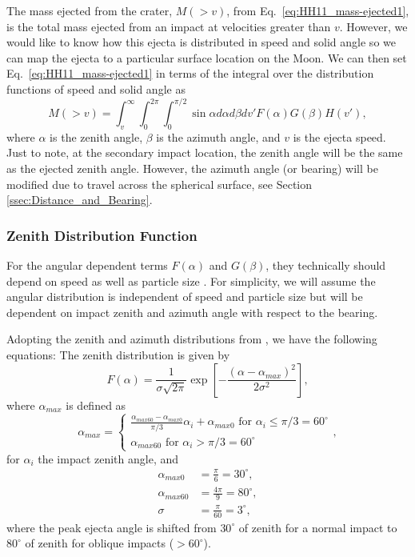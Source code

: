 \documentclass{hitec}
\numberwithin{equation}{section}
\begin{document}
The mass ejected from the crater, $M(>v)$, from Eq.\ \eqref{eq:HH11_mass-ejected1}, is the total mass ejected from an impact at velocities greater than $v$. However, we would like to know how this ejecta is distributed in speed and solid angle so we can map the ejecta to a particular surface location on the Moon. We can then set Eq.\ \eqref{eq:HH11_mass-ejected1} in terms of the integral over the distribution functions of speed and solid angle as
\begin{equation}
M(>v) = \int_{v}^{\infty}\int_{0}^{2\pi}\int_{0}^{\pi/2}\sin\alpha d\alpha d\beta dv' F(\alpha)G(\beta)H(v'),
\end{equation} 
where $\alpha$ is the zenith angle, $\beta$ is the azimuth angle, and $v$ is the ejecta speed. Just to note, at the secondary impact location, the zenith angle will be the same as the ejected zenith angle. However, the azimuth angle (or bearing) will be modified due to travel across the spherical surface, see Section \ref{ssec:Distance_and_Bearing}.



\subsubsection{Zenith Distribution Function}
\label{sssec:ZenithDistributionFunction}


For the angular dependent terms $F(\alpha)$ and $G(\beta)$, they technically should depend on speed as well as particle size \citep[e.g.,][]{rival1999modeling}. For simplicity, we will assume the angular distribution is independent of speed and particle size but will be dependent on impact zenith and azimuth angle with respect to the bearing.

Adopting the zenith and azimuth distributions from \cite{rival1999modeling}, we have the following equations:
The zenith distribution is given by
\begin{equation}\label{eq:Rival_zenith-dist}
F(\alpha) = \frac{1}{\sigma\sqrt{2\pi}}\exp\left[-\frac{(\alpha-\alpha_{max})^2}{2\sigma^2}\right],
\end{equation}
where $\alpha_{max}$ is defined as
\begin{equation}
\alpha_{max} = 
\begin{cases}
\frac{\alpha_{max60}-\alpha_{max0}}{\pi/3}\alpha_i + \alpha_{max0}\text{  for $\alpha_i\le \pi/3 = 60^\circ$}\\
\alpha_{max60}\text{  for $\alpha_i > \pi/3 = 60^\circ$}
\end{cases},
\end{equation}
for $\alpha_i$ the impact zenith angle, and \citep[see][]{ESABASE2_DebrisRelease10.0}
\begin{align}
\alpha_{max0} &= \frac{\pi}{6} = 30^\circ,\\
\alpha_{max60} &= \frac{4\pi}{9} = 80^\circ,\\
\sigma &= \frac{\pi}{60} = 3^\circ,
\end{align}
where the peak ejecta angle is shifted from $30^\circ$ of zenith for a normal impact to $80^\circ$ of zenith for oblique impacts ($>60^\circ$).
\end{document}
